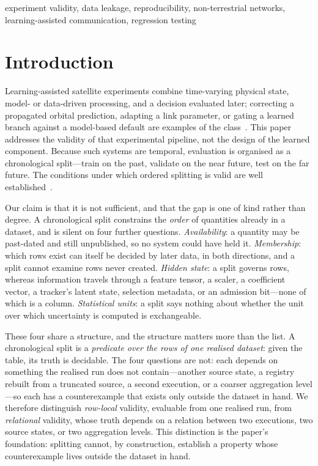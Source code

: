 \documentclass[conference]{IEEEtran}
\begin{document}
\begin{IEEEkeywords}
experiment validity, data leakage, reproducibility, non-terrestrial networks,
learning-assisted communication, regression testing
\end{IEEEkeywords}

\section{Introduction}


Learning-assisted satellite experiments combine time-varying physical state, model- or data-driven
processing, and a decision evaluated later; correcting a propagated orbital prediction, adapting a
link parameter, or gating a learned branch against a model-based default are examples of the
class~\cite{lin2021ntn}. This paper addresses the validity of that experimental pipeline, not the
design of the learned component. Because such systems are temporal, evaluation is
organised as a chronological split---train on the past, validate on the near future, test on
the far future. The conditions under which ordered splitting is valid are
well established~\cite{bergmeir2012crossval}.

Our claim is that it is not sufficient, and that the gap is one of kind rather than degree. A
chronological split constrains the \emph{order} of quantities already in a dataset, and is silent
on four further questions. \emph{Availability}: a quantity may be past-dated and still
unpublished, so no system could have held it. \emph{Membership}: which rows exist can itself be
decided by later data, in both directions, and a split cannot examine rows never created.
\emph{Hidden state}: a split governs rows, whereas information travels through a feature tensor,
a scaler, a coefficient vector, a tracker's latent state, selection metadata, or an admission
bit---none of which is a column. \emph{Statistical units}: a split says nothing about whether the unit over
which uncertainty is computed is exchangeable.

These four share a structure, and the structure matters more than the list. A chronological split
is a \emph{predicate over the rows of one realised dataset}: given the table, its truth is
decidable. The four questions are not: each depends on something the realised run does
not contain---another source state, a registry rebuilt from a truncated source, a second execution,
or a coarser aggregation level---so each has a counterexample that exists only outside the dataset
in hand. We therefore distinguish
\emph{row-local} validity, evaluable from one realised run, from \emph{relational} validity, whose
truth depends on a relation between two executions, two source states, or two aggregation levels.
This distinction is the paper's foundation: splitting cannot, by construction, establish a property
whose counterexample lives outside the dataset in hand.
\end{document}
